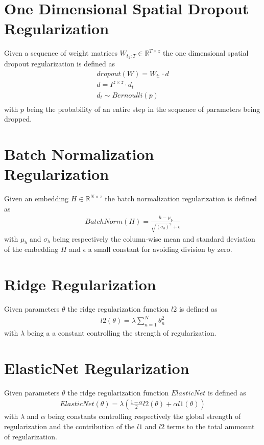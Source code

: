 \section{One Dimensional Spatial Dropout Regularization}
Given a sequence of weight matrices $W_{t_1:T} \in \mathbb{R}^{T \times z}$ the one dimensional spatial dropout regularization is defined as 
\begin{gather}
    \label{spatial_dropout}
    dropout(W) = W_{t:} \cdot d\\ \nonumber
    d = \mathit{I}^{z \times z} \cdot d_t \\ \nonumber
    d_t \sim Bernoulli(p) \\ \nonumber
\end{gather}
with $p$ being the probability of an entire step in the sequence of parameters being dropped. 

\section{Batch Normalization Regularization}
Given an embedding  $H \in \mathbb{R}^{N\times z}$ the batch normalization regularization is defined as 
\begin{gather}
    \label{batch_norm}
    BatchNorm(H) = \frac{h - \mu_b}{\sqrt{(\sigma_b)^2} + \epsilon}
\end{gather}
with $\mu_b$ and $\sigma_b$ being respectively the column-wise mean and standard deviation of the embedding $H$ and $\epsilon$ a small constant for avoiding division by zero.

\section{Ridge Regularization}
Given parameters $\theta$ the ridge regularization function $l2$ is defined as 
\begin{gather}
    \label{ridge}
    l2(\theta) = \lambda \sum_{n=1}^{N}\theta_n^2
\end{gather}
with $\lambda$ being a a constant controlling the strength of regularization.

\section{ElasticNet Regularization}
Given parameters $\theta$ the ridge regularization function $ElasticNet$ is defined as 
\begin{gather}
    \label{enet_reg}
    ElasticNet(\theta) = \lambda (\frac{1 - \alpha}{2}l2(\theta) + \alpha l1(\theta))
\end{gather}
with $\lambda$ and $\alpha$ being constants controlling respectively the global strength of regularization and the contribution of the $l1$ and $l2$ terms to the total ammount of regularization.

